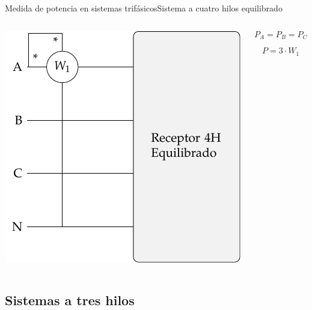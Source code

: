 \documentclass[aspectratio=169, xcolor={usenames,svgnames,dvipsnames}]{beamer}
\begin{document}
\begin{frame}{Medida de potencia en sistemas trifásicos}{Sistema a cuatro hilos equilibrado}
\begin{columns}
\begin{column}{0.7\columnwidth}
\begin{center}
\includegraphics[height=0.75\textheight]{../figs/Potencia4H_Equilibrado.pdf}
\end{center}
\end{column}

\begin{column}{0.4\columnwidth}
\[
  P_A = P_B = P_C
\]

\[
\boxed{P = 3 \cdot W_1}
\]
\end{column}
\end{columns}
\end{frame}

\subsection{Sistemas a tres hilos}
\end{document}
